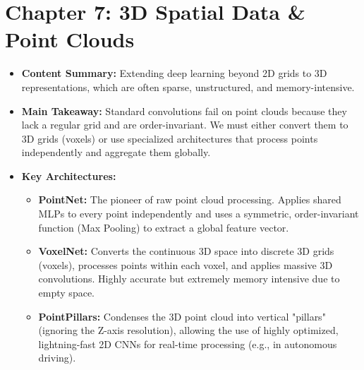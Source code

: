 \section*{Chapter 7: 3D Spatial Data \& Point Clouds}
\begin{itemize}
    \item \textbf{Content Summary:} Extending deep learning beyond 2D grids to 3D representations, which are often sparse, unstructured, and memory-intensive.
    \item \textbf{Main Takeaway:} Standard convolutions fail on point clouds because they lack a regular grid and are order-invariant. We must either convert them to 3D grids (voxels) or use specialized architectures that process points independently and aggregate them globally.
    \item \textbf{Key Architectures:}
    \begin{itemize}
        \item \textbf{PointNet:} The pioneer of raw point cloud processing. Applies shared MLPs to every point independently and uses a symmetric, order-invariant function (Max Pooling) to extract a global feature vector.
        \item \textbf{VoxelNet:} Converts the continuous 3D space into discrete 3D grids (voxels), processes points within each voxel, and applies massive 3D convolutions. Highly accurate but extremely memory intensive due to empty space.
        \item \textbf{PointPillars:} Condenses the 3D point cloud into vertical "pillars" (ignoring the Z-axis resolution), allowing the use of highly optimized, lightning-fast 2D CNNs for real-time processing (e.g., in autonomous driving).
    \end{itemize}
\end{itemize}

